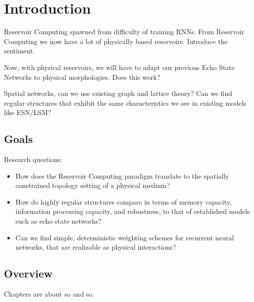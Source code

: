 \chapter{Introduction}

Reservoir Computing spawned from difficulty of training RNNs. From Reservoir
Computing we now have a lot of physically based reservoirs. Introduce the
sentiment.

Now, with physical reservoirs, we will have to adapt our previous Echo State
Networks to physical morphologies. Does this work?

Spatial networks, can we use existing graph and lattice theory? Can we find
regular structures that exhibit the same characteristics we see in existing
models like ESN/LSM?

\section{Goals}

Research questions:

\begin{itemize}
\item How does the Reservoir Computing paradigm translate to the spatially
constrained topology setting of a physical medium?
\item How do highly regular structures compare in terms of memory capacity,
information processing capacity, and robustness, to that of established models
such as echo state networks?
\item Can we find simple, deterministic weighting schemes for recurrent neural
networks, that are realizable as physical interactions?
\end{itemize}

\section{Overview}

Chapters are about so and so.

